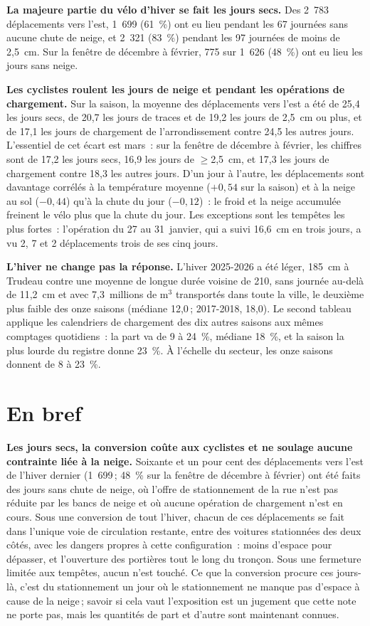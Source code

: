 \documentclass[11pt,letterpaper]{article}
\begin{document}
\textbf{La majeure partie du vélo d'hiver se fait les jours secs.} Des
2~783 déplacements vers l'est, 1~699 (61~\%) ont eu lieu pendant les 67
journées sans aucune chute de neige, et 2~321 (83~\%) pendant les 97
journées de moins de 2,5~cm. Sur la fenêtre de décembre à février, 775 sur
1~626 (48~\%) ont eu lieu les jours sans neige.

\textbf{Les cyclistes roulent les jours de neige et pendant les opérations
de chargement.} Sur la saison, la moyenne des déplacements vers l'est a
été de 25,4 les jours secs, de 20,7 les jours de traces et de 19,2 les
jours de 2,5~cm ou plus, et de 17,1 les jours de chargement de
l'arrondissement contre 24,5 les autres jours. L'essentiel de cet écart
est mars~: sur la fenêtre de décembre à février, les chiffres sont de 17,2
les jours secs, 16,9 les jours de $\geq$2,5~cm, et 17,3 les jours de
chargement contre 18,3 les autres jours. D'un jour à l'autre, les
déplacements sont davantage corrélés à la température moyenne ($+0{,}54$
sur la saison) et à la neige au sol ($-0{,}44$) qu'à la chute du jour
($-0{,}12$)~: le froid et la neige accumulée freinent le vélo plus que la
chute du jour. Les exceptions sont les tempêtes les plus fortes~:
l'opération du 27 au 31~janvier, qui a suivi 16,6~cm en trois jours, a vu
2, 7 et 2 déplacements trois de ses cinq jours.

\textbf{L'hiver ne change pas la réponse.} L'hiver 2025-2026 a été léger,
185~cm à Trudeau contre une moyenne de longue durée voisine de 210, sans
journée au-delà de 11,2~cm et avec 7,3~millions de m$^3$ transportés dans
toute la ville, le deuxième plus faible des onze saisons (médiane 12,0\,;
2017-2018, 18,0). Le second tableau applique les calendriers de chargement
des dix autres saisons aux mêmes comptages quotidiens~: la part va de 9 à
24~\%, médiane 18~\%, et la saison la plus lourde du registre donne 23~\%.
À l'échelle du secteur, les onze saisons donnent de 8 à 23~\%.

\section{En bref}

\textbf{Les jours secs, la conversion coûte aux cyclistes et ne soulage
aucune contrainte liée à la neige.} Soixante et un pour cent des
déplacements vers l'est de l'hiver dernier (1~699\,; 48~\% sur la fenêtre
de décembre à février) ont été faits des jours sans chute de neige, où
l'offre de stationnement de la rue n'est pas réduite par les bancs de
neige et où aucune opération de chargement n'est en cours. Sous une
conversion de tout l'hiver, chacun de ces déplacements se fait dans
l'unique voie de circulation restante, entre des voitures stationnées des
deux côtés, avec les dangers propres à cette configuration~: moins
d'espace pour dépasser, et l'ouverture des portières tout le long du
tronçon. Sous une fermeture limitée aux tempêtes, aucun n'est touché. Ce
que la conversion procure ces jours-là, c'est du stationnement un jour où
le stationnement ne manque pas d'espace à cause de la neige\,; savoir si
cela vaut l'exposition est un jugement que cette note ne porte pas, mais
les quantités de part et d'autre sont maintenant connues.
\end{document}
